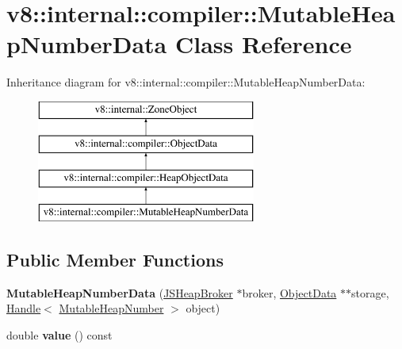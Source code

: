 \hypertarget{classv8_1_1internal_1_1compiler_1_1MutableHeapNumberData}{}\section{v8\+:\+:internal\+:\+:compiler\+:\+:Mutable\+Heap\+Number\+Data Class Reference}
\label{classv8_1_1internal_1_1compiler_1_1MutableHeapNumberData}
Inheritance diagram for v8\+:\+:internal\+:\+:compiler\+:\+:Mutable\+Heap\+Number\+Data\+:\begin{figure}[H]
\begin{center}
\leavevmode
\includegraphics[height=4.000000cm]{classv8_1_1internal_1_1compiler_1_1MutableHeapNumberData}
\end{center}
\end{figure}
\subsection*{Public Member Functions}
\begin{DoxyCompactItemize}
\item 
\mbox{\label{classv8_1_1internal_1_1compiler_1_1MutableHeapNumberData_a84ed550b1ff2b27e4d56a0eccab4d92e}} 
{\bfseries Mutable\+Heap\+Number\+Data} (\mbox{\hyperlink{classv8_1_1internal_1_1compiler_1_1JSHeapBroker}{J\+S\+Heap\+Broker}} $\ast$broker, \mbox{\hyperlink{classv8_1_1internal_1_1compiler_1_1ObjectData}{Object\+Data}} $\ast$$\ast$storage, \mbox{\hyperlink{classv8_1_1internal_1_1Handle}{Handle}}$<$ \mbox{\hyperlink{classv8_1_1internal_1_1MutableHeapNumber}{Mutable\+Heap\+Number}} $>$ object)
\item 
\mbox{\label{classv8_1_1internal_1_1compiler_1_1MutableHeapNumberData_a26e2d3ba0fec47341dfb697756e6ee34}} 
double {\bfseries value} () const
\end{DoxyCompactItemize}
